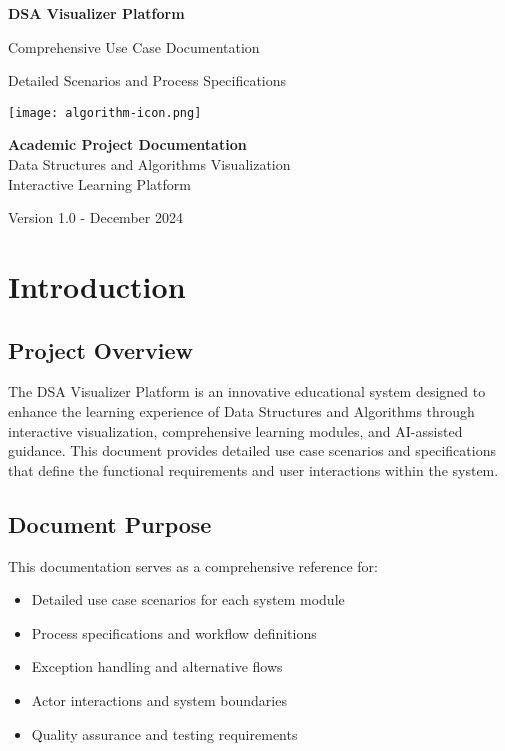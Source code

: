 \documentclass[12pt,a4paper]{article}
\begin{document}
\begin{titlepage}
    \centering
    \vspace*{2cm}
    
    {\Huge\bfseries DSA Visualizer Platform}
    
    \vspace{0.5cm}
    {\Large\textcolor{primaryblue}{Comprehensive Use Case Documentation}}
    
    \vspace{1.5cm}
    {\large Detailed Scenarios and Process Specifications}
    
    \vspace{2cm}
    \texttt{[image: algorithm-icon.png]}
    
    \vfill
    
    {\large
    \textbf{Academic Project Documentation}\\
    \vspace{0.3cm}
    Data Structures and Algorithms Visualization\\
    Interactive Learning Platform\\
    }
    
    \vspace{1cm}
    {\large Version 1.0 - December 2024}
    
\end{titlepage}

\newpage
\tableofcontents
\newpage

\section{Introduction}

\subsection{Project Overview}
The DSA Visualizer Platform is an innovative educational system designed to enhance the learning experience of Data Structures and Algorithms through interactive visualization, comprehensive learning modules, and AI-assisted guidance. This document provides detailed use case scenarios and specifications that define the functional requirements and user interactions within the system.

\subsection{Document Purpose}
This documentation serves as a comprehensive reference for:
\begin{itemize}
    \item Detailed use case scenarios for each system module
    \item Process specifications and workflow definitions
    \item Exception handling and alternative flows
    \item Actor interactions and system boundaries
    \item Quality assurance and testing requirements
\end{itemize}
\end{document}
